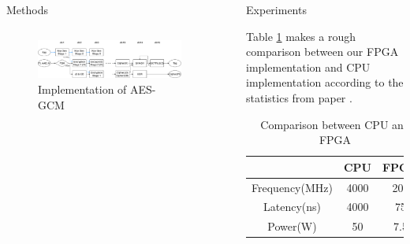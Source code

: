\documentclass[final]{beamer}
\newlength{\sepwid}
\newlength{\onecolwid}
\newlength{\twocolwid}
\begin{document}
\begin{frame}[t]
\begin{columns}[t]
\begin{column}{\twocolwid}
\begin{columns}[t,totalwidth=\twocolwid]
\begin{column}{\onecolwid}
\begin{block}{Methods}
\begin{figure}
\label{fig:paral}
\end{figure}


\end{block}


\end{column} %

\end{columns} %


\begin{figure}
\includegraphics[width=1\linewidth]{poster/aes_gcm_fpga.pdf}
\caption{Implementation of AES-GCM}
\label{impl}
\end{figure}

\end{column} %

\begin{column}{\sepwid}\end{column} %

\begin{column}{\onecolwid} %


\begin{block}{Experiments}

Table \ref{comp} makes a rough comparison between our FPGA implementation and CPU implementation according to the statistics from paper \cite{caulfield2016cloud}.

\begin{table}
\vspace{2ex}
\begin{tabular}{ccc}
\toprule
 & \textbf{CPU} & \textbf{FPGA}\\
\midrule
Frequency(MHz) & 4000 & 200\\
Latency(ns) & 4000 & 75 \\
Power(W)  & 50 & 7.5 \\
\bottomrule
\end{tabular}
\caption{Comparison between CPU and FPGA}
\label{comp}
\end{table}


\end{block}
\end{column}
\end{columns}
\end{frame}
\end{document}
